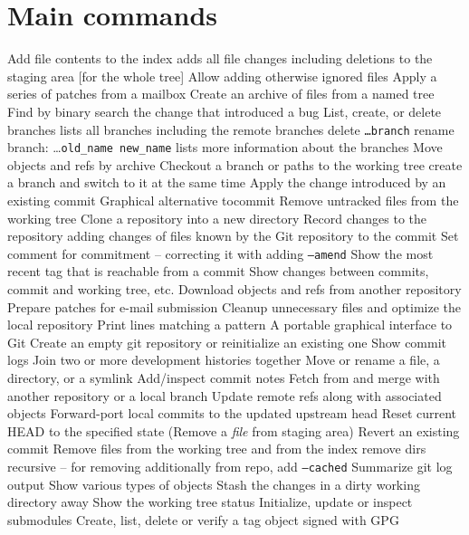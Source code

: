 \section{Main commands}
	{Add file contents to the index}
	{adds all file changes including deletions to the staging area [for the whole tree]}
	{Allow adding otherwise ignored files}
	{Apply a series of patches from a mailbox}
	{Create an archive of files from a named tree}
	{Find by binary search the change that introduced a bug}
	{List, create, or delete branches}
	{lists all branches including the remote branches}
	{delete {\tt \dots branch}}
	{rename branch: \dots {\tt old\_name new\_name}}
	{lists more information about the branches}
	{Move objects and refs by archive}
	{Checkout a branch or paths to the working tree}
	{create a branch and switch to it at the same time}
	{Apply the change introduced by an existing commit}
	{Graphical alternative tocommit}
	{Remove untracked files from the working tree}
	{Clone a repository into a new directory}
	{Record changes to the repository}
	{adding changes of files known by the Git repository to the commit}
	{Set comment for commitment -- correcting it with adding {\tt --amend}}
	{Show the most recent tag that is reachable from a commit}
	{Show changes between commits, commit and working tree, etc.}
	{Download objects and refs from another repository}
	{Prepare patches for e-mail submission}
	{Cleanup unnecessary files and optimize the local repository}
	{Print lines matching a pattern}
	{A portable graphical interface to Git}
	{Create an empty git repository or reinitialize an existing one}
	{Show commit logs}
	{Join two or more development histories together}
	{Move or rename a file, a directory, or a symlink}
	{Add/inspect commit notes}
	{Fetch from and merge with another re\-pository or a local branch}
	{Update remote refs along with associated objects}
	{Forward-port local commits to the updated upstream head}
	{Reset current HEAD to the specified state (Remove a {\it file} from
staging area)}
	{Revert an existing commit}
	{Remove files from the working tree and from the index}
	{remove dirs recursive -- for removing additionally from repo, add
{\tt --cached}}
	{Summarize git log output}
	{Show various types of objects}
	{Stash the changes in a dirty working directory away}
	{Show the working tree status}
	{Initialize, update or inspect submodules}
	{Create, list, delete or verify a tag object signed with GPG}

